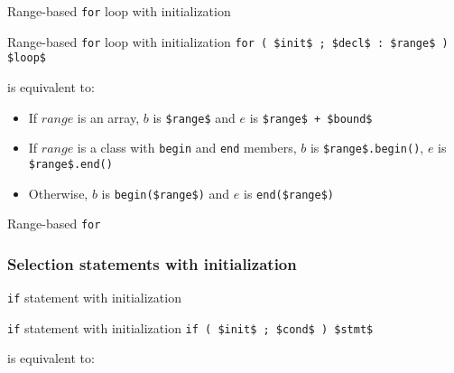 \begin{frame}{Range-based \texttt{for} loop with initialization}{}
  \begin{block}{Range-based \texttt{for} loop with initialization}
    {
      \hfill\lstinline[mathescape]!for ( $init$ ; $decl$ : $range$ ) $loop$!\hfill
    }

    is equivalent to:

    \smaller

    \begin{itemize}
    \item
      If $range$ is an array, $b$ is \lstinline[mathescape]!$range$! and $e$ is \lstinline[mathescape]!$range$ + $bound$!
    \item
      If $range$ is a class with \lstinline!begin! and \lstinline!end! members, $b$ is \lstinline[mathescape]!$range$.begin()!, $e$ is \lstinline[mathescape]!$range$.end()!
    \item
      Otherwise, $b$ is \lstinline[mathescape]!begin($range$)! and $e$ is \lstinline[mathescape]!end($range$)!
    \end{itemize}
  \end{block}
\end{frame}

\begin{frame}{Range-based \texttt{for}}{}
  \begin{example}
  \end{example}
\end{frame}

\subsubsection{Selection statements with initialization}

\begin{frame}{\texttt{if} statement with initialization}{}
  \begin{block}{\texttt{if} statement with initialization}
    {
      \hfill\lstinline[mathescape]!if ( $init$ ; $cond$ ) $stmt$!\hfill
    }

    is equivalent to:

    \smaller
    
  \end{block}

  \begin{example}
  \end{example}
\end{frame}

